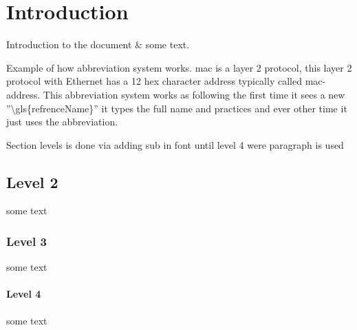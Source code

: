 \section{Introduction}

Introduction to the document \& some text.

Example of how abbreviation system works. \gls{mac} is a layer 2 protocol, this layer 2 protocol with Ethernet has a  12 hex character address typically called \gls{mac}-address. This abbreviation system works as following the first time it sees a new ''\textbackslash gls\{refrenceName\}'' it types the full name and practices and ever other time it just uses the abbreviation.

Section levels is done via adding sub in font until level 4 were paragraph is used
\subsection{Level 2}
some text
\subsubsection{Level 3}
some text
\paragraph{Level 4}
\noindent some text

